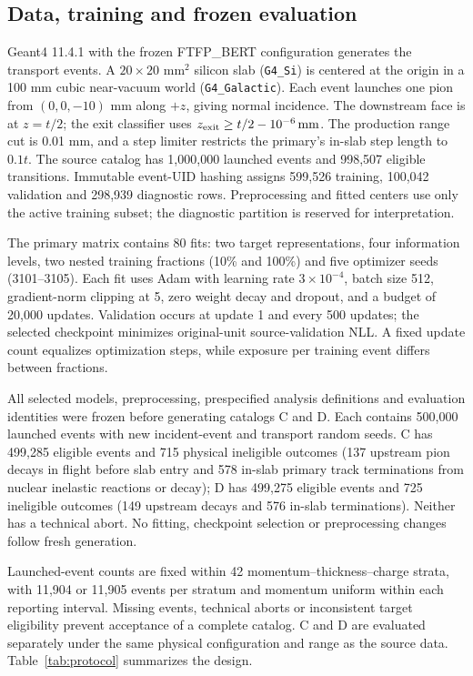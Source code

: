 \documentclass[twocolumn,epjc3]{svjour3}
\begin{document}
\subsection{Data, training and frozen evaluation}
\label{sec:fresh_design}

Geant4 11.4.1 with the frozen FTFP\_BERT configuration generates the transport
events. A $20\times20$ mm$^2$ silicon slab (\texttt{G4\_Si}) is centered
at the origin in a 100 mm cubic near-vacuum world (\texttt{G4\_Galactic}).
Each event launches one pion from $(0,0,-10)$ mm along $+z$, giving normal
incidence. The downstream face is at $z=t/2$; the exit classifier uses
$z_{\rm exit}\geq t/2-10^{-6}\,\mathrm{mm}$. The production range cut is 0.01 mm,
and a step limiter restricts the primary's in-slab step length to $0.1t$.
The source catalog has 1,000,000 launched events and 998,507 eligible
transitions. Immutable event-UID hashing assigns 599,526 training,
100,042 validation and 298,939 diagnostic rows. Preprocessing and fitted
centers use only the active training subset; the diagnostic partition is
reserved for interpretation.

The primary matrix contains 80 fits: two target representations, four
information levels, two nested training fractions (10\% and 100\%) and
five optimizer seeds (3101--3105). Each fit uses Adam with learning rate
$3\times10^{-4}$, batch size 512, gradient-norm clipping at 5, zero weight
decay and dropout, and a budget of 20,000 updates. Validation occurs at update
1 and every 500 updates; the selected checkpoint minimizes original-unit
source-validation NLL. A fixed update count equalizes optimization steps,
while exposure per training event differs between fractions.

All selected models, preprocessing, prespecified analysis definitions and evaluation
identities were frozen before generating catalogs C and D. Each contains
500,000 launched events with new incident-event and transport random seeds.
C has 499,285 eligible events and 715 physical ineligible outcomes (137
upstream pion decays in flight before slab entry and 578 in-slab primary track
terminations from nuclear inelastic reactions or decay); D has 499,275 eligible
events and 725 ineligible outcomes (149 upstream decays and 576 in-slab
terminations). Neither has a technical abort. No fitting, checkpoint
selection or preprocessing changes follow fresh generation.

Launched-event counts are fixed within 42 momentum--thickness--\allowbreak charge strata,
with 11,904 or 11,905 events per stratum and momentum uniform within each
reporting interval. Missing events, technical aborts or inconsistent target
eligibility prevent acceptance of a complete catalog. C and D are evaluated
separately under the same physical configuration and range as the source data.
Table~\ref{tab:protocol} summarizes the design.
\end{document}
